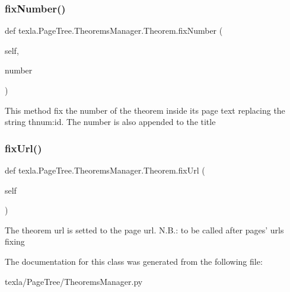 \subsubsection{\texorpdfstring{fix\+Number()}{fixNumber()}}
{\footnotesize\ttfamily def texla.\+Page\+Tree.\+Theorems\+Manager.\+Theorem.\+fix\+Number (\begin{DoxyParamCaption}\item[{}]{self,  }\item[{}]{number }\end{DoxyParamCaption})}

\begin{DoxyVerb}This method fix the number of the theorem
inside its page text replacing the string {{thnum:id}}.
The number is also appended to the title\end{DoxyVerb}
 \hypertarget{classtexla_1_1PageTree_1_1TheoremsManager_1_1Theorem_a894e4a4e21490eab706503be1c65c6d9}{}\label{classtexla_1_1PageTree_1_1TheoremsManager_1_1Theorem_a894e4a4e21490eab706503be1c65c6d9} 
\subsubsection{\texorpdfstring{fix\+Url()}{fixUrl()}}
{\footnotesize\ttfamily def texla.\+Page\+Tree.\+Theorems\+Manager.\+Theorem.\+fix\+Url (\begin{DoxyParamCaption}\item[{}]{self }\end{DoxyParamCaption})}

\begin{DoxyVerb}The theorem url is setted to the page url.
N.B.: to be called after pages' urls fixing\end{DoxyVerb}
 

The documentation for this class was generated from the following file\+:\begin{DoxyCompactItemize}
\item 
texla/\+Page\+Tree/Theorems\+Manager.\+py\end{DoxyCompactItemize}
